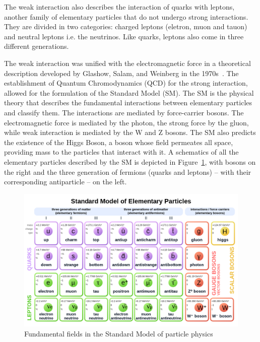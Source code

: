 The weak interaction also describes the interaction of quarks with leptons, another family of elementary particles that do not undergo strong interactions. They are divided in two categories: charged leptons (eletron, muon and tauon) and neutral leptons i.e. the neutrinos. Like quarks, leptons also come in three different generations.  

The weak interaction was unified with the electromagnetic force in a theoretical description developed by Glashow, Salam, and Weinberg in the 1970s~\cite{Glashow:1961tr, Weinberg:1967tq, Salam:1968rm, Georgi:1974sy}. The establishment of Quantum Chromodynamics (QCD) for the strong interaction, allowed for the formulation of the Standard Model (SM). The SM is the physical theory that describes the fundamental interactions between elementary particles and classify them. The interactions are mediated by force-carrier bosons. The electromagnetic force is mediated by the photon, the strong force by the gluon, while weak interaction is mediated by the W and Z bosons. The SM also predicts the existence of the Higgs Boson, a boson whose field permeates all space, providing mass to the particles that interact with it. A schematics of all the elementary particles described by the SM is depicted in Figure~\ref{fig:SM}, with bosons on the right and the three generation of fermions (quarks and leptons) -- with their corresponding antiparticle -- on the left. 

\begin{figure}
    \centering
    \includegraphics[width=\textwidth]{figures/Standard_Model_of_Elementary_Particles_Anti.svg.png}
    \caption{Fundamental fields in the Standard Model of particle physics}
    \label{fig:SM}
\end{figure}


